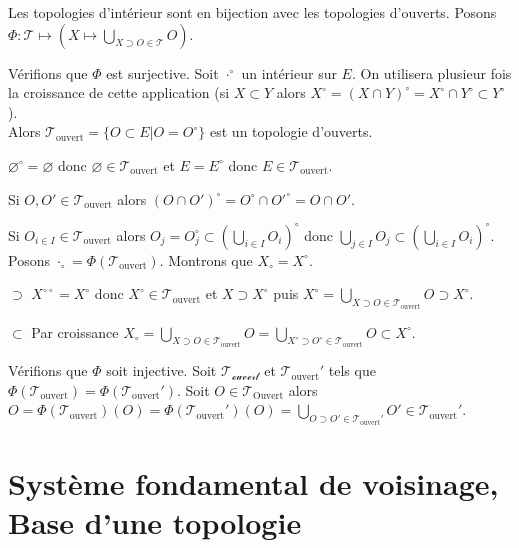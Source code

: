 \documentclass[a4paper, 11pt, french]{book}
\newenvironment{itemise}{\itemize}{\enditemize}
\theoremstyle{plain} %
\theoremstyle{definition} %
\theoremstyle{remark} %
\newcommand{\1}{\mathds{1}}
\newcommand\vide{\varnothing}
\begin{document}
\proposition
Les topologies d'intérieur sont en bijection avec les topologies d'ouverts.
\demonstration
Posons $\Phi\colon\mathscr{T}\mapsto(X\mapsto\bigcup_{X\supset O\in\mathscr{T}}O)$.
\begin{itemise}
	\item Vérifions que $\Phi$ est surjective.
	Soit $\cdot^\circ$ un intérieur sur $E$.
	On utilisera plusieur fois la croissance de cette application (si $X\subset Y$ alors $X^\circ=(X\cap Y)^\circ=X^\circ\cap Y^\circ\subset Y^\circ$). \\
	Alors $\mathscr{T}_\text{ouvert}=\{O\subset E|O=O^\circ\}$ est un topologie d'ouverts.
	\begin{itemise}
		\item $\vide^\circ=\vide$ donc $\vide\in\mathscr{T}_\text{ouvert}$ et $E=E^\circ$ donc $E\in\mathscr{T}_\text{ouvert}$.
		\item Si $O, O'\in\mathscr{T}_\text{ouvert}$
		alors $(O\cap O')^\circ=O^\circ\cap{O'}^\circ=O\cap O'$.
		\item Si $O_{i\in I}\in\mathscr{T}_\text{ouvert}$
		alors $O_j=O_j^\circ\subset(\bigcup_{i\in I}O_i)^\circ$
		donc $\bigcup_{j\in I}O_j\subset(\bigcup_{i\in I}O_i)^\circ$.
	\end{itemise}
	Posons $\cdot_\circ=\Phi(\mathscr{T}_\text{ouvert})$.
	Montrons que $X_\circ=X^\circ$.
	\begin{itemise}
		\item[$\supset$] $X^{\circ\circ}=X^\circ$ donc $X^\circ\in\mathscr{T}_\text{ouvert}$ et $X\supset X^\circ$ puis $X^\circ=\bigcup_{X\supset O\in\mathscr{T}_\text{ouvert}}O\supset X^\circ$.
		\item[$\subset$] Par croissance $X_\circ=\bigcup_{X\supset O\in\mathscr{T}_\text{ouvert}}O=\bigcup_{X^\circ\supset O^\circ\in\mathscr{T}_\text{ouvert}}O\subset X^\circ$.
	\end{itemise}
	\item Vérifions que $\Phi$ soit injective.
	Soit $\mathscr{T_\text{ouvert}}$ et $\mathscr{T}_\text{ouvert}'$ tels que $\Phi(\mathscr{T}_\text{ouvert})=\Phi(\mathscr{T}_\text{ouvert}')$.
	Soit $O\in\mathscr{T}_\text{Ouvert}$ alors $O=\Phi(\mathscr{T}_\text{ouvert})(O)=\Phi(\mathscr{T}_\text{ouvert}')(O)=\bigcup_{O\supset O'\in\mathscr{T}_\text{ouvert}'}O'\in\mathscr{T}_\text{ouvert}'$.
\end{itemise}

\section{Système fondamental de voisinage, Base d'une topologie}
\end{document}

